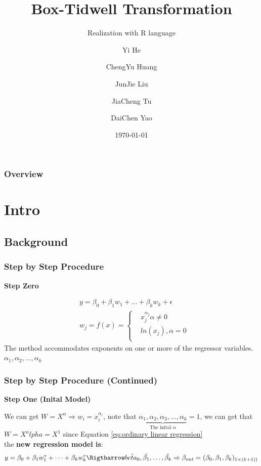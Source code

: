 \documentclass[10pt,aspectratio=32]{beamer}
\title{Box-Tidwell Transformation}
\subtitle{Realization with R language}
\author{Yi He \and ChengYu Huang \and JunJie Liu \\ \and JiaCheng Tu \and DaiChen Yao }
\institute{United International College - STAT}
\date{\today}
\begin{document}
\AtBeginSection[]{\frame{\sectionpage}} %

\begin{frame}
	\titlepage
\end{frame}

\begin{frame}
	\frametitle{Overview}
	\vspace{-0.7cm}
	\tableofcontents
\end{frame}

\section{Intro}
\subsection{Background}

\begin{frame}
\frametitle{Step by Step Procedure}
\vspace{-0.3cm}

\textbf{Step Zero}

$$\begin{align}
&y = \beta_0 + \beta_1 w_1 + \dots + \beta_k w_k + \epsilon \label{eq:ordinary linear regression} \\
&w_j = f(x) =\left\{
\begin{aligned}
&x_j^{\alpha_j}  \alpha \neq 0 \\
&ln(x_j), \alpha = 0 \label{eq:ransformation of X}\\
\end{aligned}
\right.
\end{align}
$$
The method accommodates exponents on one or more of the regressor variables. $\alpha_1, \alpha_2, \dots,\alpha_k $
 \end{frame}

\begin{frame}
	\frametitle{Step by Step Procedure (Continued)}
\textbf{Step One (Inital Model)}

We can get $W = X^{\alpha} \Rightarrow w_i = x_i^{\alpha_i}$, note that  $\underbrace{\alpha_1, \alpha_2, \alpha_3, \dots, \alpha_k}_{\text{The inital $\alpha$}} = 1$, we can get that $W = X ^ alpha = X^1$ since Equation \ref{eq:ordinary linear regression} \\ the \textbf{new regression model is}:
$$y = \beta_0 + \beta_1 w_1^* + \dots + \beta_k w_k^* \Rigtharrow \hat{beta_0}, \hat{\beta_1}, \dots, \hat{\beta_k} \Rightarrow \beta_{out} = (\beta_0, \beta_1, \beta_k)_{1 \times (k + 1))}$$
\end{frame}
\end{document}
